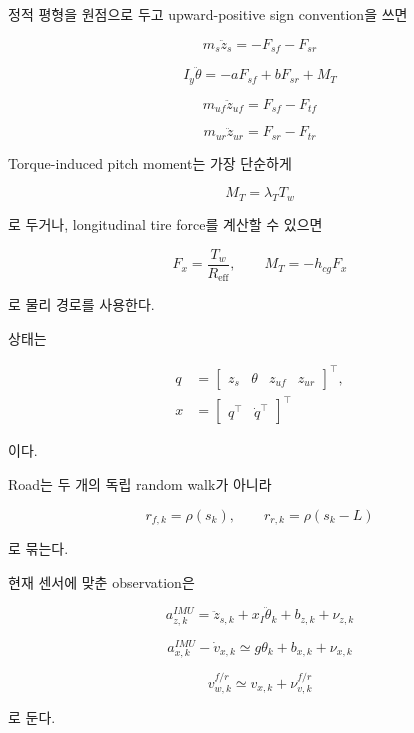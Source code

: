 \documentclass[letterpaper,10pt,journal,twocolumn]{ieeeconf}
\begin{document}
정적 평형을 원점으로 두고 upward-positive sign convention을 쓰면

\[
m_s\ddot z_s
=
-F_{sf}-F_{sr}
\]

\[
I_y\ddot\theta
=
-aF_{sf}
+bF_{sr}
+M_T
\]

\[
m_{uf}\ddot z_{uf}
=
F_{sf}-F_{tf}
\]

\[
m_{ur}\ddot z_{ur}
=
F_{sr}-F_{tr}
\]

Torque-induced pitch moment는 가장 단순하게

\[
M_T=\lambda_TT_w
\]

로 두거나, longitudinal tire force를 계산할 수 있으면

\[
F_x=\frac{T_w}{R_{\mathrm{eff}}},
\qquad
M_T=-h_{cg}F_x
\]

로 물리 경로를 사용한다.

상태는

\[
\begin{aligned}
q&=
\begin{bmatrix}
z_s&\theta&z_{uf}&z_{ur}
\end{bmatrix}^{\top},\\
x&=
\begin{bmatrix}
q^\top&\dot q^\top
\end{bmatrix}^{\top}
\end{aligned}
\]

이다.

Road는 두 개의 독립 random walk가 아니라

\[
r_{f,k}=\rho(s_k),
\qquad
r_{r,k}=\rho(s_k-L)
\]

로 묶는다.

현재 센서에 맞춘 observation은

\[
a_{z,k}^{IMU}
=
\ddot z_{s,k}
+x_I\ddot\theta_k
+b_{z,k}
+\nu_{z,k}
\]

\[
a_{x,k}^{IMU}-\dot v_{x,k}
\simeq
g\theta_k+b_{x,k}+\nu_{x,k}
\]

\[
v_{w,k}^{f/r}
\simeq
v_{x,k}+\nu_{v,k}^{f/r}
\]

로 둔다.
\end{document}
